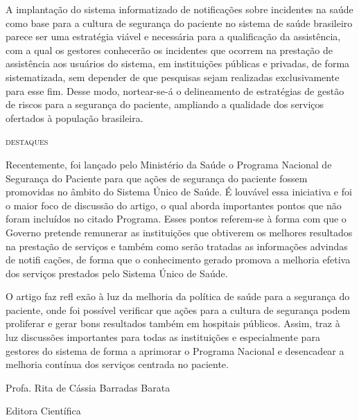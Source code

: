 \documentclass{article}
\begin{document}
A implantação do sistema informatizado de notificações sobre incidentes na saúde
como base
para a cultura de segurança do paciente no sistema de saúde brasileiro parece
ser uma
estratégia viável e necessária para a qualificação da assistência, com a qual os
gestores
conhecerão os incidentes que ocorrem na prestação de assistência aos usuários do
sistema, em
instituições públicas e privadas, de forma sistematizada, sem depender de que
pesquisas
sejam realizadas exclusivamente para esse fim. Desse modo, nortear-se-á o
delineamento de
estratégias de gestão de riscos para a segurança do paciente, ampliando a
qualidade dos
serviços ofertados à população brasileira.

\textsc{destaques}

Recentemente, foi lançado pelo Ministério da Saúde o Programa Nacional de
Segurança do
Paciente para que ações de segurança do paciente fossem promovidas no âmbito do
Sistema
Único de Saúde. É louvável essa iniciativa e foi o maior foco de discussão do
artigo, o qual
aborda importantes pontos que não foram incluídos no citado Programa. Esses
pontos
referem-se à forma com que o Governo pretende remunerar as instituições que
obtiverem os
melhores resultados na prestação de serviços e também como serão tratadas as
informações
advindas de notifi cações, de forma que o conhecimento gerado promova a melhoria
efetiva dos
serviços prestados pelo Sistema Único de Saúde.

O artigo faz refl exão à luz da melhoria da política de saúde para a segurança
do paciente,
onde foi possível verificar que ações para a cultura de segurança podem
proliferar e gerar
bons resultados também em hospitais públicos. Assim, traz à luz discussões
importantes para
todas as instituições e especialmente para gestores do sistema de forma a
aprimorar o
Programa Nacional e desencadear a melhoria contínua dos serviços centrada no
paciente.

Profa. Rita de Cássia Barradas Barata

Editora Científica
\end{document}
